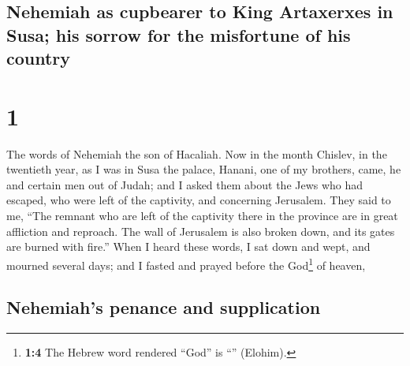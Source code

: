 \hypertarget{nehemiah-as-cupbearer-to-king-artaxerxes-in-susa-his-sorrow-for-the-misfortune-of-his-country}{%
\subsection{Nehemiah as cupbearer to King Artaxerxes in Susa; his sorrow
for the misfortune of his
country}\label{nehemiah-as-cupbearer-to-king-artaxerxes-in-susa-his-sorrow-for-the-misfortune-of-his-country}}

\hypertarget{section}{%
\section{1}\label{section}}

 The words of Nehemiah the son of Hacaliah. Now in the
month Chislev, in the twentieth year, as I was in Susa the palace,
 Hanani, one of my brothers, came, he and certain men out
of Judah; and I asked them about the Jews who had escaped, who were left
of the captivity, and concerning Jerusalem.  They said to
me, ``The remnant who are left of the captivity there in the province
are in great affliction and reproach. The wall of Jerusalem is also
broken down, and its gates are burned with fire.''  When I
heard these words, I sat down and wept, and mourned several days; and I
fasted and prayed before the God\footnote{\textbf{1:4} The Hebrew word
  rendered ``God'' is ``'' (Elohim).} of heaven,

\hypertarget{nehemiahs-penance-and-supplication}{%
\subsection{Nehemiah's penance and
supplication}\label{nehemiahs-penance-and-supplication}}

